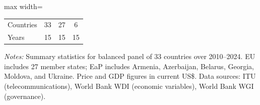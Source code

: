 \begin{table}[htbp]
\begin{threeparttable}
\begin{adjustbox}{max width=\textwidth}
\begin{tabular}{lcccccc}
Countries & \multicolumn{2}{c}{33} & \multicolumn{2}{c}{27} & \multicolumn{2}{c}{6} \\
Years & \multicolumn{2}{c}{15} & \multicolumn{2}{c}{15} & \multicolumn{2}{c}{15} \\
\bottomrule
\end{tabular}
\end{adjustbox}
\begin{tablenotes}[flushleft]
\small
\item \textit{Notes:} Summary statistics for balanced panel of 33 countries over 2010--2024. EU includes 27 member states; EaP includes Armenia, Azerbaijan, Belarus, Georgia, Moldova, and Ukraine. Price and GDP figures in current US\$. Data sources: ITU (telecommunications), World Bank WDI (economic variables), World Bank WGI (governance).
\end{tablenotes}
\end{threeparttable}
\end{table}